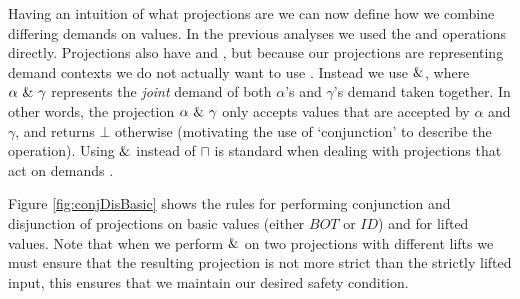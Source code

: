 Having an intuition  of what projections are we can now define how we combine
differing demands on values. In the previous analyses we used the \meet and
\join operations directly. Projections also have \meet and \join, but because
our projections are representing demand contexts we do not actually want to use
\meet. Instead we use $\&$, where $\alpha\ \&\ \gamma$ represents the
\emph{joint} demand of both $\alpha$'s and $\gamma$'s demand taken together. In
other words, the projection $\alpha\ \&\ \gamma$ only accepts values that
are accepted by $\alpha$ and $\gamma$, and returns $\bot$ otherwise (motivating
the use of `conjunction' to describe the operation). Using $\&$ instead of
$\sqcap$ is standard when dealing with projections that act on demands
\citep{wadler1987projections, hinze1995projection, SergeyDemand}.

Figure \ref{fig:conjDisBasic} shows the rules for performing conjunction and
disjunction of projections on basic values (either $BOT$ or $ID$) and for
lifted values. Note that when we perform $\&$ on two projections with
different lifts we must ensure that the resulting projection is not more strict
than the strictly lifted input, this ensures that we maintain our desired safety
condition.

